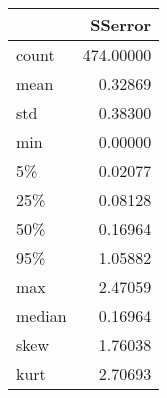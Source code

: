 \begin{tabular}{lr}
\toprule
{} &    SSerror \\
\midrule
count  &  474.00000 \\
mean   &    0.32869 \\
std    &    0.38300 \\
min    &    0.00000 \\
5\%     &    0.02077 \\
25\%    &    0.08128 \\
50\%    &    0.16964 \\
95\%    &    1.05882 \\
max    &    2.47059 \\
median &    0.16964 \\
skew   &    1.76038 \\
kurt   &    2.70693 \\
\bottomrule
\end{tabular}

